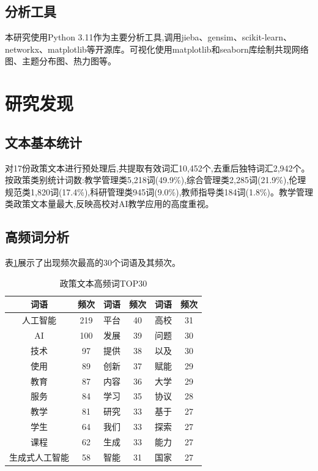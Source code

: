 \documentclass[cn,11pt,chinese]{article}
\begin{document}
\subsection{分析工具}

本研究使用Python 3.11作为主要分析工具,调用jieba、gensim、scikit-learn、networkx、matplotlib等开源库。可视化使用matplotlib和seaborn库绘制共现网络图、主题分布图、热力图等。

\section{研究发现}

\subsection{文本基本统计}

对17份政策文本进行预处理后,共提取有效词汇10,452个,去重后独特词汇2,942个。按政策类别统计词数:教学管理类5,218词(49.9\%),综合管理类2,285词(21.9\%),伦理规范类1,820词(17.4\%),科研管理类945词(9.0\%),教师指导类184词(1.8\%)。教学管理类政策文本量最大,反映高校对AI教学应用的高度重视。

\subsection{高频词分析}

表\ref{tab:top-words}展示了出现频次最高的30个词语及其频次。

\begin{table}[H]
\centering
\caption{政策文本高频词TOP30}
\label{tab:top-words}
\small
\begin{tabular}{cccccc}
\toprule
词语 & 频次 & 词语 & 频次 & 词语 & 频次 \\
\midrule
人工智能 & 219 & 平台 & 40 & 高校 & 31 \\
AI & 100 & 发展 & 39 & 问题 & 30 \\
技术 & 97 & 提供 & 38 & 以及 & 30 \\
使用 & 89 & 创新 & 37 & 赋能 & 29 \\
教育 & 87 & 内容 & 36 & 大学 & 29 \\
服务 & 84 & 学习 & 35 & 协议 & 28 \\
教学 & 81 & 研究 & 33 & 基于 & 27 \\
学生 & 64 & 我们 & 33 & 探索 & 27 \\
课程 & 62 & 生成 & 33 & 能力 & 27 \\
生成式人工智能 & 58 & 智能 & 31 & 国家 & 27 \\
\bottomrule
\end{tabular}
\end{table}
\end{document}

